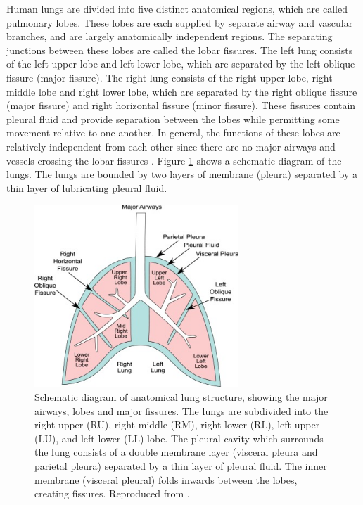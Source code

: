 Human lungs are divided into five distinct anatomical regions, which are called pulmonary lobes. These lobes are each supplied by separate airway and vascular branches, and are largely anatomically independent regions. The separating junctions between these lobes are called the lobar fissures. The left lung consists of the left upper lobe and left lower lobe, which are separated by the left oblique fissure (major fissure). The right lung consists of the right upper lobe, right middle lobe and right lower lobe, which are separated by the right oblique fissure (major fissure) and right horizontal fissure (minor fissure). These fissures contain pleural fluid and provide separation between the lobes while permitting some movement relative to one another. In general, the functions of these lobes are relatively independent from each other since there are no major airways and vessels crossing the lobar fissures \citep{lassen2010automatic,doel2015review,ukil2009anatomy}. Figure \ref{fig:LobeAnatomicalStructure} shows a schematic diagram of the lungs. The lungs are bounded by two layers of membrane (pleura) separated by a thin layer of lubricating pleural fluid. 

\begin{figure}[h!]
  \centering 
  \includegraphics[height=2.7in]{Segmentation/Image/LobeAnatomicalStructure.jpg}
  \caption{Schematic diagram of anatomical lung structure, showing the major airways, lobes and major fissures. The lungs are subdivided into the right upper (RU), right middle (RM), right lower (RL), left upper (LU), and left lower (LL) lobe. The pleural cavity which surrounds the lung consists of a double membrane layer (visceral pleura and parietal pleura) separated by a thin layer of pleural fluid. The inner membrane (visceral pleural) folds inwards between the lobes, creating fissures. Reproduced from \citep{doel2015review}.}
  \label{fig:LobeAnatomicalStructure}
\end{figure}

